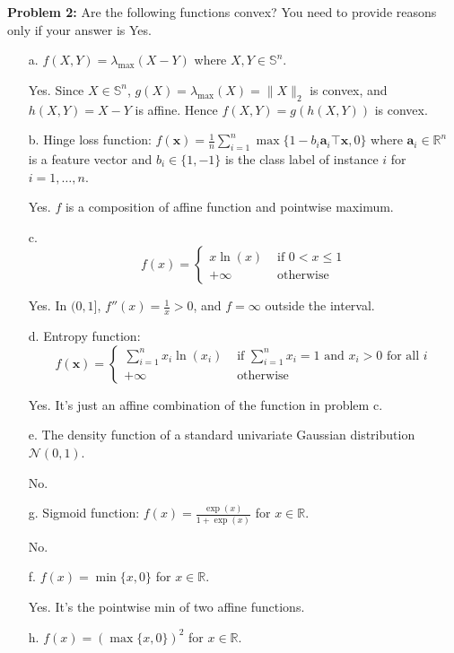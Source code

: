 \documentclass{article}
\newcommand{\bx}{{\mathbf x}}
\newcommand{\ba}{{\mathbf a}}
\begin{document}
\noindent\textbf{Problem 2:} Are the following functions convex? You need to provide reasons only if your answer is Yes.
\begin{enumerate}
\item[a.] $f(X,Y)=\lambda_{\max}(X-Y)$ where $X,Y\in\mathbb{S}^n$.

Yes. Since $X\in\mathbb{S}^n $, $ g(X) = \lambda_{\max}(X) = \lVert X\rVert_2 $ is convex, and $h(X, Y) = X-Y$ is affine. Hence $f(X, Y) = g(h(X, Y))$ is convex.

\item[b.] Hinge loss function: $f(\bx)=\frac{1}{n}\sum_{i=1}^n\max\{1-b_i\ba_i\top \bx,0\}$ where $\ba_i\in\mathbb{R}^n$ is a feature vector and $b_i\in\{1,-1\}$ is the class label of instance $i$ for $i=1,\dots,n$.

Yes. $f$ is a composition of affine function and pointwise maximum.

\item[c.] 
$$
f(x)=\left\{\begin{array}{ll}
x\ln(x)&\text{ if }0< x\leq 1\\
+\infty&\text{ otherwise}
\end{array}
\right.
$$

Yes. In $(0, 1]$, $f''(x) = \frac{1}{x} > 0$, and $f = \infty $ outside the interval.

\item[d.] Entropy function: 
$$
f(\bx)=
\left\{
\begin{array}{ll}
\sum_{i=1}^{n}x_i\ln(x_i)&\text{ if }\sum_{i=1}^nx_i=1\text{ and }x_i>0\text{ for all }i\\
+\infty&\text{ otherwise}
\end{array}
\right.
$$

Yes. It's just an affine combination of the function in problem c.

\item[e.] The density function of a standard univariate Gaussian distribution $\mathcal{N}(0,1)$. 

No.

\item[g.] Sigmoid function: $f(x)=\frac{\exp(x)}{1+\exp(x)}$ for $x\in\mathbb{R}$.

No.

\item[f.] $f(x)=\min\{x,0\}$ for $x\in\mathbb{R}$.

Yes. It's the pointwise min of two affine functions.

\item[h.] $f(x)=(\max\{x,0\})^2$ for $x\in\mathbb{R}$.


\end{enumerate}
\end{document}
